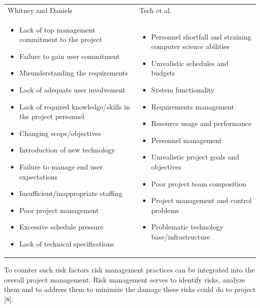 \begin{table}[H]
	\centering
	\begin{tabular}{p{}p{}}
		Whitney and Daniels  & Tech et al. \\
		\begin{itemize}	\item	Lack of top management commitment to the project	
			\item	Failure to gain user commitment	
			\item	Misunderstanding the requirements	
			\item	Lack of adequate user involvement	
			\item	 Lack of required knowledge/skills in the project personnel	
			\item	Changing scope/objectives	
			\item	Introduction of new technology	
			\item	Failure to manage end user expectations	
			\item	Insufficient/inappropriate staffing	
			\item	Poor project management	
			\item	Excessive schedule pressure	
			\item	Lack of technical specifications	\end{itemize}
		&
		\begin{itemize}	\item	 Personnel shortfall and straining computer science abilities	
			\item	Unrealistic schedules and budgets	
			\item	System functionality	
			\item	Requirements management	
			\item	Resource usage and performance	
			\item	Personnel management	
			\item	Unrealistic project goals and objectives	
			\item	 Poor project team composition	
			\item	 Project management and control problems	
			\item	Problematic technology base/infrastructure		 
		\end{itemize}	
	\end{tabular}
\end{table}
To counter such risk factors risk management practices can be integrated into the overall project management. Risk management serves to identify risks, analyze them and to address them to minimize the damage these risks could do to project [8]. \\

